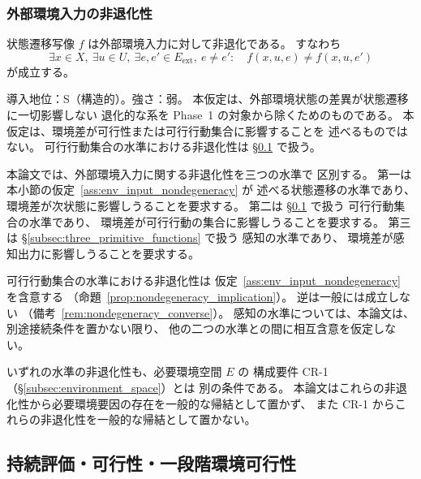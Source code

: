 \subsubsection{外部環境入力の非退化性}

\begin{assumption}[外部環境入力に対する動学的非退化性]
\label{ass:env_input_nondegeneracy}
状態遷移写像 $f$ は外部環境入力に対して非退化である。
すなわち
\[
  \exists x\in X,\
  \exists u\in U,\
  \exists e,e'\in E_{\mathrm{ext}},\
  e\neq e':
  \quad
  f(x,u,e)\neq f(x,u,e')
\]
が成立する。

\medskip
\noindent
導入地位：S（構造的）。強さ：弱。
本仮定は、外部環境状態の差異が状態遷移に一切影響しない
退化的な系を Phase~1 の対象から除くためのものである。
本仮定は、環境差が可行性または可行行動集合に影響することを
述べるものではない。
可行行動集合の水準における非退化性は
\S\ref{subsec:viability_function_and_blockage} で扱う。
\end{assumption}

\begin{remark}[非退化条件の水準の区別]
\label{rem:nondegeneracy_levels}
本論文では、外部環境入力に関する非退化性を三つの水準で
区別する。
第一は本小節の仮定~\ref{ass:env_input_nondegeneracy} が
述べる状態遷移の水準であり、
環境差が次状態に影響しうることを要求する。
第二は \S\ref{subsec:viability_function_and_blockage} で扱う
可行行動集合の水準であり、
環境差が可行行動の集合に影響しうることを要求する。
第三は \S\ref{subsec:three_primitive_functions} で扱う
感知の水準であり、
環境差が感知出力に影響しうることを要求する。

可行行動集合の水準における非退化性は
仮定~\ref{ass:env_input_nondegeneracy} を含意する
（命題~\ref{prop:nondegeneracy_implication}）。
逆は一般には成立しない
（備考~\ref{rem:nondegeneracy_converse}）。
感知の水準については、本論文は、別途接続条件を置かない限り、
他の二つの水準との間に相互含意を仮定しない。

いずれの水準の非退化性も、必要環境空間 $E$ の
構成要件 CR-1（\S\ref{subsec:environment_space}）とは
別の条件である。
本論文はこれらの非退化性から必要環境要因の存在を一般的な帰結として置かず、
また CR-1 からこれらの非退化性を一般的な帰結として置かない。
\end{remark}

\subsection{持続評価・可行性・一段階環境可行性}
\label{subsec:viability_function_and_blockage}

